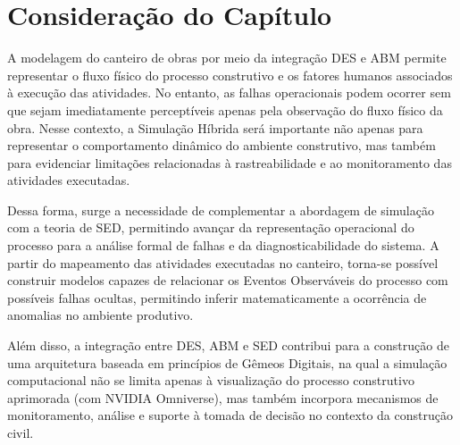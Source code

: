 \section{Consideração do Capítulo}

A modelagem do canteiro de obras por meio da integração DES e ABM permite representar o fluxo físico do processo construtivo e os fatores humanos associados à execução das atividades. No entanto, as falhas operacionais podem ocorrer sem que sejam imediatamente perceptíveis apenas pela observação do fluxo físico da obra. Nesse contexto, a Simulação Híbrida será importante não apenas para representar o comportamento dinâmico do ambiente construtivo, mas também para evidenciar limitações relacionadas à rastreabilidade e ao monitoramento das atividades executadas.

Dessa forma, surge a necessidade de complementar a abordagem de simulação com a teoria de SED, permitindo avançar da representação operacional do processo para a análise formal de falhas e da diagnosticabilidade do sistema. A partir do mapeamento das atividades executadas no canteiro, torna-se possível construir modelos capazes de relacionar os Eventos Observáveis do processo com possíveis falhas ocultas, permitindo inferir matematicamente a ocorrência de anomalias no ambiente produtivo.

Além disso, a integração entre DES, ABM e SED contribui para a construção de uma arquitetura baseada em princípios de Gêmeos Digitais, na qual a simulação computacional não se limita apenas à visualização do processo construtivo aprimorada (com NVIDIA Omniverse), mas também incorpora mecanismos de monitoramento, análise e suporte à tomada de decisão no contexto da construção civil.

 
